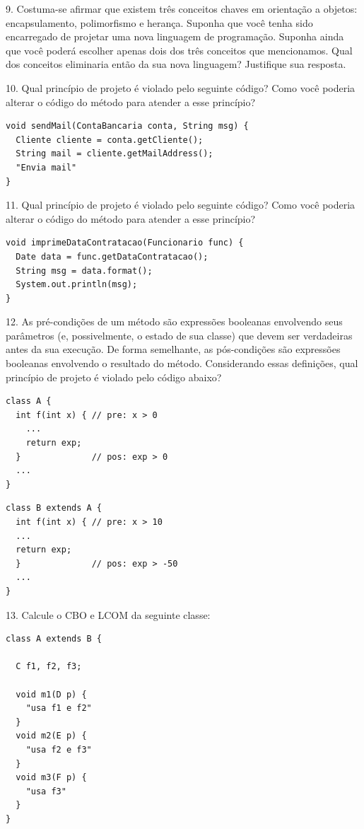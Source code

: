 \documentclass[
  11pt,
  twoside]{book}
\begin{document}
9. Costuma-se afirmar que existem três conceitos chaves em orientação a
objetos: encapsulamento, polimorfismo e herança. Suponha que você tenha
sido encarregado de projetar uma nova linguagem de programação. Suponha
ainda que você poderá escolher apenas dois dos três conceitos que
mencionamos. Qual dos conceitos eliminaria então da sua nova linguagem?
Justifique sua resposta.

10. Qual princípio de projeto é violado pelo seguinte código? Como você
poderia alterar o código do método para atender a esse princípio?

\begin{lstlisting}
void sendMail(ContaBancaria conta, String msg) {
  Cliente cliente = conta.getCliente();
  String mail = cliente.getMailAddress();
  "Envia mail"
}  
\end{lstlisting}

11. Qual princípio de projeto é violado pelo seguinte código? Como você
poderia alterar o código do método para atender a esse princípio?

\newpage

\begin{lstlisting}
void imprimeDataContratacao(Funcionario func) {
  Date data = func.getDataContratacao();
  String msg = data.format();
  System.out.println(msg);
}  
\end{lstlisting}

12. As pré-condições de um método são expressões booleanas envolvendo
seus parâmetros (e, possivelmente, o estado de sua classe) que devem ser
verdadeiras antes da sua execução. De forma semelhante, as pós-condições
são expressões booleanas envolvendo o resultado do método. Considerando
essas definições, qual princípio de projeto é violado pelo código
abaixo?

\begin{lstlisting}
class A {  
  int f(int x) { // pre: x > 0
    ...
    return exp;
  }              // pos: exp > 0
  ...
}
\end{lstlisting}

\begin{lstlisting}
class B extends A {  
  int f(int x) { // pre: x > 10
  ...
  return exp;
  }              // pos: exp > -50
  ...
}
\end{lstlisting}

13. Calcule o CBO e LCOM da seguinte classe:

\begin{lstlisting}
class A extends B {

  C f1, f2, f3;

  void m1(D p) {
    "usa f1 e f2"
  }
  void m2(E p) {
    "usa f2 e f3"
  }
  void m3(F p) {
    "usa f3"  
  }
}
\end{lstlisting}
\end{document}
